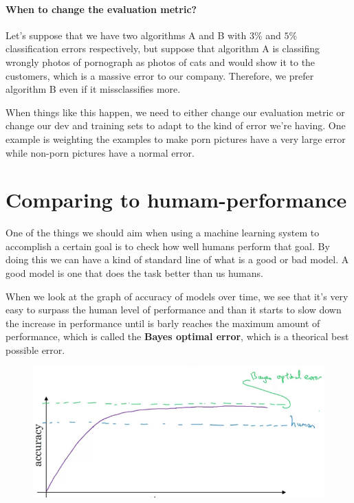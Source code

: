 \documentclass[12pt, a4paper, oneside]{book}
\begin{document}
\paragraph{When to change the evaluation metric?}%
\label{par:when_to_change_the_evaluation_metric}

Let's suppose that we have two algorithms A and B with $3\%$ and $5\%$
classification errors respectively, but suppose that algorithm A is classifing
wrongly photos of pornograph as photos of cats and would show it to the
customers, which is a massive error to our company. Therefore, we prefer
algorithm B even if it missclassifies more.

When things like this happen, we need to either change our evaluation metric or
change our dev and training sets to adapt to the kind of error we're having. One
example is weighting the examples to make porn pictures have a very large error
while non-porn pictures have a normal error.

\section{Comparing to humam-performance}%
\label{sec:comparing_to_humam_performance}

One of the things we should aim when using a machine learning system to
accomplish a certain goal is to check how well humans perform that goal. By
doing this we can have a kind of standard line of what is a good or bad model. A
good model is one that does the task better than us humans.

When we look at the graph of accuracy of models over time, we see that it's very
easy to surpass the human level of performance and than it starts to slow down
the increase in performance until is barly reaches the maximum amount of
performance, which is called the \textbf{Bayes optimal error}, which is a
theorical best possible error.

\begin{figure}[h]
\centering
\includegraphics[scale=0.6]{Res/human-performance.png}
\caption{}
\label{human-performance.png}
\end{figure}
\end{document}
